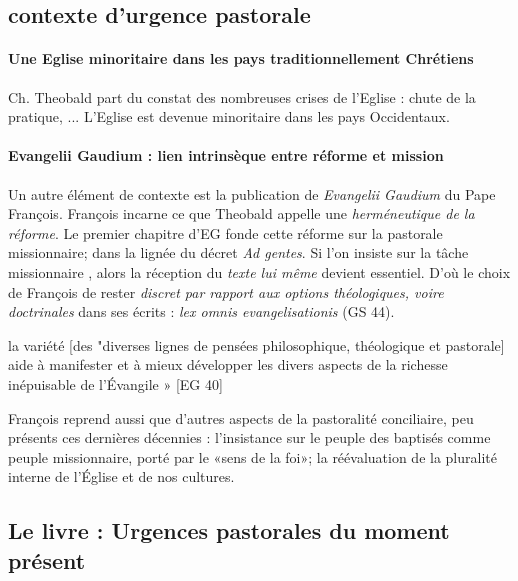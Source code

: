  
 
 

 \subsection{contexte d'urgence pastorale}


\paragraph{Une Eglise minoritaire dans les pays traditionnellement Chrétiens} Ch. Theobald part du constat des nombreuses crises de l'Eglise : chute de la pratique, ... L'Eglise est devenue minoritaire dans les pays Occidentaux. 
 

\paragraph{Evangelii Gaudium : lien intrinsèque entre réforme et mission} Un autre élément de contexte est la publication de \textit{Evangelii Gaudium} du Pape François. François incarne ce que Theobald \cite{theobald_pastoralite_2021} appelle une \textit{herméneutique de la réforme}. Le premier chapitre d'EG fonde cette réforme sur la pastorale missionnaire; dans la lignée du décret \textit{Ad gentes}. Si l'on insiste sur la tâche missionnaire \cite[p.162]{theobald_courage_2021}, alors la réception du \textit{texte lui même} devient essentiel. D'où le choix de François de rester \textit{discret par rapport aux options théologiques, voire doctrinales} dans ses écrits : \textit{lex omnis evangelisationis } (GS 44).
\begin{singlequote}
     la variété [des "diverses lignes de pensées philosophique, théologique et pastorale] aide à manifester et à mieux développer les divers aspects de la richesse inépuisable de l'Évangile » [EG 40]
\end{singlequote}

François reprend aussi que d'autres aspects de la pastoralité conciliaire, peu présents ces dernières décennies : l'insistance sur le peuple des baptisés comme peuple missionnaire, porté par le «sens de la foi»; la réévaluation de la pluralité interne de l'Église et de nos cultures. \cite{theobald_pastoralite_2021}



\subsection{Le livre : Urgences pastorales du moment présent}

